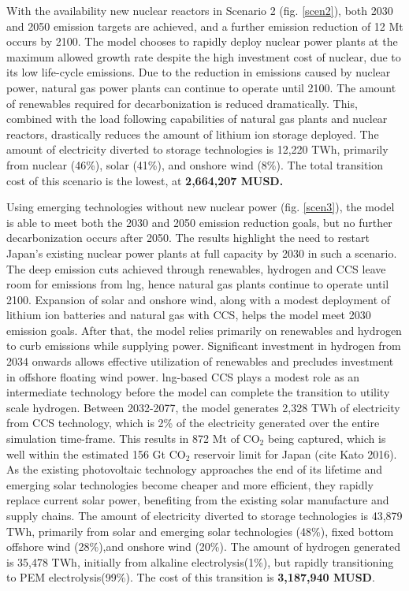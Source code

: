 With the availability new nuclear reactors in Scenario 2 (fig. \ref{scen2}), both 2030 and 2050 emission targets are achieved, and a further emission reduction of 12 Mt occurs by 2100. The model chooses to rapidly deploy nuclear power plants at the maximum allowed growth rate despite the high investment cost of nuclear, due to its low life-cycle emissions. Due to the reduction in emissions caused by nuclear power, natural gas power plants can continue to operate until 2100. The amount of renewables required for decarbonization is reduced dramatically. This, combined with the load following capabilities of natural gas plants and nuclear reactors, drastically reduces the amount of lithium ion storage deployed. The amount of electricity diverted to storage technologies is 12,220 TWh, primarily from nuclear (46\%), solar (41\%), and onshore wind (8\%). The total transition cost of this scenario is the lowest, at \textbf{2,664,207 MUSD.}

Using emerging technologies without new nuclear power (fig. \ref{scen3}), the model is able to meet both the 2030 and 2050 emission reduction goals, but no further decarbonization occurs after 2050. The results highlight the need to restart Japan's existing nuclear power plants at full capacity by 2030 in such a scenario. The deep emission cuts achieved through renewables, hydrogen and \gls{CCS} leave room for emissions from \gls{lng}, hence natural gas plants continue to operate until 2100. Expansion of solar and onshore wind, along with a modest deployment of lithium ion batteries and natural gas with \gls{CCS}, helps the model meet 2030 emission goals. After that, the model relies primarily on renewables and hydrogen to curb emissions while supplying power. Significant investment in hydrogen from 2034 onwards allows effective utilization of renewables and precludes investment in offshore floating wind power. \gls{lng}-based \gls{CCS} plays a modest role as an intermediate technology before the model can complete the transition to utility scale hydrogen. Between 2032-2077, the model generates 2,328 TWh  of electricity from \gls{CCS} technology, which is 2\% of the electricity generated over the entire simulation time-frame. This results in 872 Mt of CO$_2$ being captured, which is well within the estimated 156 Gt CO$_2$ reservoir limit for Japan (cite Kato 2016). As the existing photovoltaic technology approaches the end of its lifetime and emerging solar technologies become cheaper and more efficient, they rapidly replace current solar power, benefiting from the existing solar manufacture and supply chains. The amount of electricity diverted to storage technologies is 43,879 TWh, primarily from solar and emerging solar technologies (48\%), fixed bottom offshore wind (28\%),and onshore wind (20\%). The amount of hydrogen generated is 35,478 TWh, initially from alkaline electrolysis(1\%), but rapidly transitioning to PEM electrolysis(99\%). The cost of this transition is \textbf{3,187,940 MUSD}.

